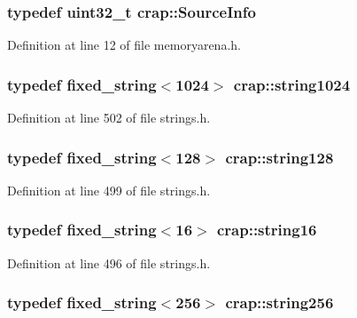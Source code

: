 \hypertarget{namespacecrap_acad6ca15596aab071175697e764086bb}{
\subsubsection[{Source\+Info}]{\setlength{\rightskip}{0pt plus 5cm}typedef uint32\+\_\+t {\bf crap\+::\+Source\+Info}}}\label{namespacecrap_acad6ca15596aab071175697e764086bb}


Definition at line 12 of file memoryarena.\+h.

\hypertarget{namespacecrap_acbceaa050a351b36f8b29129f49621c1}{
\subsubsection[{string1024}]{\setlength{\rightskip}{0pt plus 5cm}typedef {\bf fixed\+\_\+string}$<$1024$>$ {\bf crap\+::string1024}}}\label{namespacecrap_acbceaa050a351b36f8b29129f49621c1}


Definition at line 502 of file strings.\+h.

\hypertarget{namespacecrap_a6d163720fa009acb153550f4486ff6da}{
\subsubsection[{string128}]{\setlength{\rightskip}{0pt plus 5cm}typedef {\bf fixed\+\_\+string}$<$128$>$ {\bf crap\+::string128}}}\label{namespacecrap_a6d163720fa009acb153550f4486ff6da}


Definition at line 499 of file strings.\+h.

\hypertarget{namespacecrap_a6cff91a13d8be23072b3a0754c947caa}{
\subsubsection[{string16}]{\setlength{\rightskip}{0pt plus 5cm}typedef {\bf fixed\+\_\+string}$<$16$>$ {\bf crap\+::string16}}}\label{namespacecrap_a6cff91a13d8be23072b3a0754c947caa}


Definition at line 496 of file strings.\+h.

\hypertarget{namespacecrap_af674ac1cc38a09c563c68dfc3b15e554}{
\subsubsection[{string256}]{\setlength{\rightskip}{0pt plus 5cm}typedef {\bf fixed\+\_\+string}$<$256$>$ {\bf crap\+::string256}}}\label{namespacecrap_af674ac1cc38a09c563c68dfc3b15e554}



